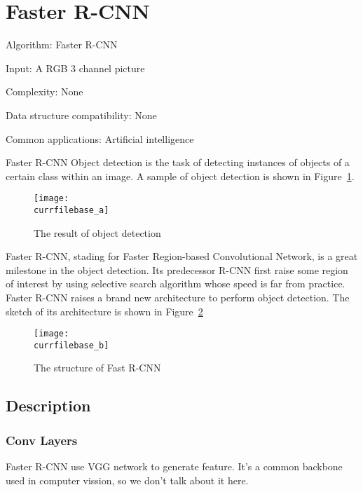 \documentclass[catalog.tex]{subfiles}
\begin{document}
\def\pbname{Faster R-CNN} %

\section{\pbname} 

\begin{overview}
\item [Algorithm:] Faster R-CNN 
\item [Input:] A RGB 3 channel picture
\item [Complexity:] None
\item [Data structure compatibility:] None
\item [Common applications:] Artificial intelligence
\end{overview}


\begin{problem}{\pbname}
Object detection is the task of detecting instances of objects of a certain class within an image. A sample of object detection is shown in Figure~\ref{fig:\currfilebase_a}.
\begin{figure}[!htb]
\centering
\texttt{[image: \\currfilebase\_a]}
	\caption{The result of object detection}
	\label{fig:\currfilebase_a}
\end{figure}
Faster R-CNN\cite{fasterrcnn}, stading for Faster Region-based Convolutional
Network, is a great milestone in the object detection. Its predecessor R-CNN\cite{rcnn} first raise some region of interest by using selective search algorithm whose speed is far from practice. Faster R-CNN raises a brand new architecture to perform object detection. The sketch of its architecture is shown in Figure~\ref{fig:\currfilebase_b}
\begin{figure}[!htb]
\centering
\texttt{[image: \\currfilebase\_b]}
	\caption{The structure of Fast R-CNN}
	\label{fig:\currfilebase_b}
\end{figure}
\end{problem}
\subsection*{Description}
\subsubsection{Conv Layers}
Faster R-CNN use VGG network\cite{vgg} to generate feature. It's a common backbone used in computer vission, so we don't talk about it here. 
\end{document}
